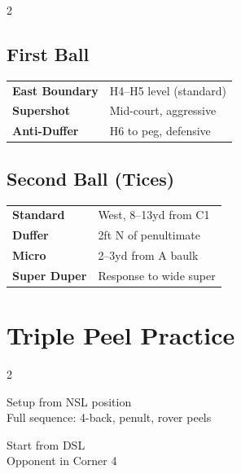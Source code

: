 \documentclass[11pt,a4paper]{article}
\begin{document}
\begin{multicols}{2}

\subsection*{First Ball}
\begin{tabular}{@{}ll@{}}
\textbf{East Boundary} & H4--H5 level (standard) \\
\textbf{Supershot} & Mid-court, aggressive \\
\textbf{Anti-Duffer} & H6 to peg, defensive \\
\end{tabular}

\subsection*{Second Ball (Tices)}
\begin{tabular}{@{}ll@{}}
\textbf{Standard} & West, 8--13yd from C1 \\
\textbf{Duffer} & 2ft N of penultimate \\
\textbf{Micro} & 2--3yd from A baulk \\
\textbf{Super Duper} & Response to wide super \\
\end{tabular}

\end{multicols}

\section{Triple Peel Practice}

\begin{multicols}{2}

\begin{tcolorbox}[drillbox, colframe=breakcolor!70, title={\color{breakcolor}Standard TP (17 min)}]
Setup from NSL position\\
Full sequence: 4-back, penult, rover peels
\end{tcolorbox}

\begin{tcolorbox}[drillbox, colframe=breakcolor!70, title={\color{breakcolor}Delayed TP (18 min)}]
Start from DSL\\
Opponent in Corner 4
\end{tcolorbox}

\end{multicols}
\end{document}

